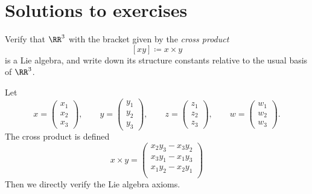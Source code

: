 \documentclass{article}
\begin{document}
\begin{corollary}
\end{corollary}

\section{Solutions to exercises}

\begin{exercise}[Humphreys 1.1]
    Verify that $\RR^3$ with the bracket given by the \textit{cross product}
    \[
        [xy]
        \coloneq
        x \times y
    \]
    is a Lie algebra, and write down its structure constants relative to the usual basis of $\RR^3$.
\end{exercise}

Let 
\[
    x
    =
    \begin{pmatrix}
        x_1 \\ x_2 \\ x_3
    \end{pmatrix}, \qquad
    y
    =
    \begin{pmatrix}
        y_1 \\ y_2 \\ y_3
    \end{pmatrix}, \qquad
    z
    =
    \begin{pmatrix}
        z_1 \\ z_2 \\ z_3
    \end{pmatrix}, \qquad
    w
    =
    \begin{pmatrix}
        w_1 \\ w_2 \\ w_3
    \end{pmatrix}.
\]
The cross product is defined
\[
    x \times y
    =
    \begin{pmatrix}
        x_2y_3 - x_3y_2 \\
        x_3y_1 - x_1y_3 \\
        x_1y_2 - x_2y_1 \\
    \end{pmatrix}
\]
Then we directly verify the Lie algebra axioms.
\end{document}
